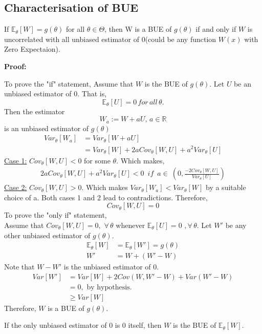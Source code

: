 \documentclass[a4paper,english,12pt]{article}
\begin{document}
\subsection{Characterisation of BUE}
\begin{thm}
If $\mathbb{E}_\theta[W]=g(\theta)$ for all $\theta\in\Theta$, then W is a BUE of $g(\theta)$ if and only if $W$  is uncorrelated with all unbiased estimator of $0$(could be any function $W(x)$ with Zero Expectaion).
\end{thm} 
\begin{flushleft}
\textbf{Proof:}
\end{flushleft}
To prove the "if" statement,
Assume that $W$ is the BUE of $g(\theta)$.
Let $U$ be an unbiased estimator of 0. That is, $$\mathbb{E}_\theta[U]=0 \,for\, all\, \theta.$$
Then the estimator $$W_a:=W+aU,\,a\in\mathbb{R}$$ is an unbiased estimator of $g(\theta)$
\begin{align}
\nonumber
Var_\theta[W_a]&=Var_\theta[W+aU]\\
&=Var_\theta[W]+2aCov_\theta[W,U]+a^2Var_\theta[U]
\end{align}
\underline{Case 1:} $Cov_\theta[W,U]<0$ for some $\theta$.
Which makes, 
\begin{align}
2aCov_\theta[W,U]+a^2Var_\theta[U]<0 \, \, \,if\, \, \, a\in\ \left(0,\frac{-2Cov_\theta[W,U]}{Var_\theta[U]} \right)
\end{align}
\underline{Case 2:} $Cov_\theta[W,U]>0.$
Which makes $Var_\theta[W_a]<Var_\theta[W]$ by a suitable choice of a.
Both cases 1 and 2 lead to contradictions. Therefore, $$Cov_\theta[W,U]=0$$
To prove the "only if" statement,\\
Assume that $ Cov_\theta[W,U]=0, \,\,\forall \,\theta$ whenever $\mathbb{E}_\theta[U]=0\,\, , \forall \,\theta$.
Let $W'$ be any other unbiased estimator of $g(\theta)$.
\begin{align*}
\mathbb{E}_\theta[W]&=\mathbb{E}_\theta[W']=g(\theta)\\
W'&=W+(W'-W)
\end{align*}
Note that $W-W'$ is the unbiased estimator of 0.
\begin{align*}
Var[W']&=Var[W]+2Cov(W,W'-W)+Var(W'-W)\\
&=0, \,\, \textrm{by hypothesis.}\\
&\geq Var[W]
\end{align*}
Therefore, $W$ is a BUE of $g(\theta)$.\\
\begin{cor} 
If the only unbiased estimator of 0 is 0 itself, then $W$ is the BUE of $\mathbb{E}_\theta[W]$.\\
\end{cor}
\end{document}
